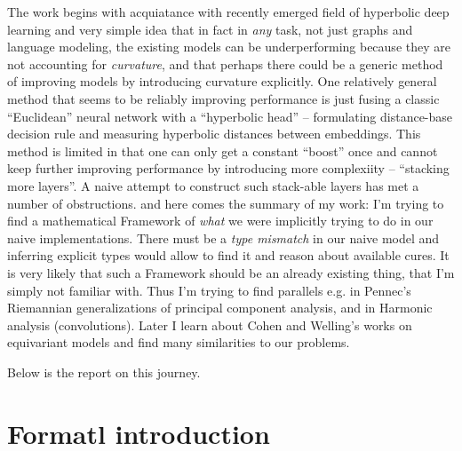 The work begins with acquiatance with recently emerged field of hyperbolic deep
learning and very simple idea that in fact in \emph{any} task, not just graphs
and language modeling, the existing models can be underperforming because they
are not accounting for \emph{curvature}, and that perhaps there could be a
generic method of improving models by introducing curvature explicitly.  One
relatively general method that seems to be reliably improving performance is
just fusing a classic ``Euclidean'' neural network with a ``hyperbolic head''
-- formulating distance-base decision rule and measuring hyperbolic distances
between embeddings. This method is limited in that one can only get a constant
``boost'' once and cannot keep further improving performance by introducing
more complexiity -- ``stacking more layers''. A naive attempt to construct such
stack-able layers has met a number of obstructions. and here comes the summary
of my work: I'm trying to find a mathematical Framework of \emph{what} we were
implicitly trying to do in our naive implementations. There must be a
\emph{type mismatch} in our naive model and inferring explicit types would
allow to find it and reason about available cures. It is very likely that such
a Framework should be an already existing thing, that I'm simply not familiar
with. Thus I'm trying to find parallels e.g. in Pennec's Riemannian
generalizations of principal component analysis, and in Harmonic analysis
(convolutions).  Later I learn about Cohen and Welling's works on equivariant
models and find many similarities to our problems.

Below is the report on this journey.

\section*{Formatl introduction}

